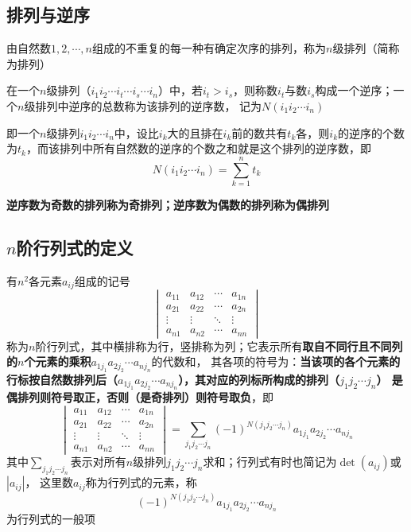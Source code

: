 \documentclass[UTF8]{ctexart}
\newcommand{\abs}[1]{{\left|{#1}\right|}}
\newcommand{\emplin}{\vspace{1em}}
\begin{document}
\subsection*{排列与逆序}
由自然数$1,2,\cdots,n$组成的不重复的每一种有确定次序的排列，称为$n$级排列（简称为排列）

\emplin

在一个$n$级排列（$i_1i_2\cdots i_t\cdots i_s\cdots i_n$）中，若$i_t>i_s$，则称数$i_t$与数$i_s$构成一个逆序；一个$n$级排列中逆序的总数称为该排列的逆序数，
记为$N(i_1i_2\cdots i_n)$

即一个$n$级排列$i_1i_2\cdots i_n$中，设比$i_k$大的且排在$i_k$前的数共有$t_k$各，则$i_k$的逆序的个数为$t_k$，而该排列中所有自然数的逆序的个数之和就是这个排列的逆序数，即
\[N(i_1i_2\cdots i_n)=\sum_{k=1}^nt_k\]

\emplin

\textbf{逆序数为奇数的排列称为奇排列；逆序数为偶数的排列称为偶排列}

\subsection*{$n$阶行列式的定义}
有$n^2$各元素$a_{ij}$组成的记号
\[\begin{vmatrix}
a_{11}&a_{12}&\cdots&a_{1n}\\
a_{21}&a_{22}&\cdots&a_{2n}\\
\vdots&\vdots&\ddots&\vdots\\
a_{n1}&a_{n2}&\cdots&a_{nn}
\end{vmatrix}\]
称为$n$阶行列式，其中横排称为行，竖排称为列；它表示所有\textbf{取自不同行且不同列的$n$个元素的乘积$a_{1j_1}a_{2j_2}\cdots a_{nj_n}$}的代数和，
其各项的符号为：\textbf{当该项的各个元素的行标按自然数排列后（$a_{1j_1}a_{2j_2}\cdots a_{nj_n}$），其对应的列标所构成的排列（$j_1j_2\cdots j_n$）
是偶排列则符号取正，否则（是奇排列）则符号取负}，即
\[\begin{vmatrix}
a_{11}&a_{12}&\cdots&a_{1n}\\
a_{21}&a_{22}&\cdots&a_{2n}\\
\vdots&\vdots&\ddots&\vdots\\
a_{n1}&a_{n2}&\cdots&a_{nn}
\end{vmatrix}=
\sum_{j_1j_2\cdots j_n}(-1)^{N(j_1j_2\cdots j_n)}a_{1j_1}a_{2j_2}\cdots a_{nj_n}
\]
其中$\displaystyle\sum_{j_1j_2\cdots j_n}$表示对所有$n$级排列$j_1j_2\cdots j_n$求和；行列式有时也简记为$\det(a_{ij})$或$\abs{a_{ij}}$，
这里数$a_{ij}$称为行列式的元素，称
\[(-1)^{N(j_1j_2\cdots j_n)}a_{1j_1}a_{2j_2}\cdots a_{nj_n}\]
为行列式的一般项
\end{document}
